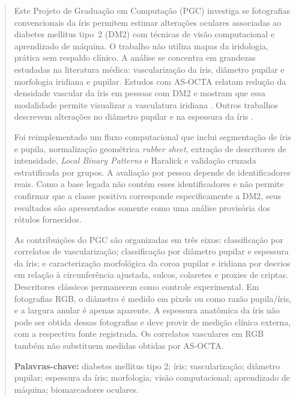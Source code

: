 \documentclass[12pt,a4paper]{article}
\begin{document}
\begin{abstract}
\noindent
Este Projeto de Graduação em Computação (PGC) investiga se fotografias convencionais da íris permitem
estimar alterações oculares associadas ao diabetes mellitus tipo~2 (DM2) com técnicas de visão
computacional e aprendizado de máquina. O trabalho não utiliza mapas da iridologia, prática sem
respaldo clínico. A análise se concentra em grandezas estudadas na literatura médica: vascularização
da íris, diâmetro pupilar e morfologia iridiana e pupilar. Estudos com AS-OCTA relatam redução da
densidade vascular da íris em pessoas com DM2 \citep{Zhou2025SciRep} e mostram que essa modalidade
permite visualizar a vasculatura iridiana \citep{Roberts2017CER,Zett2018Graefes}. Outros trabalhos
descrevem alterações no diâmetro pupilar e na espessura da íris
\citep{Cui2024BMC,Thakar2025Eye}.

Foi reimplementado um fluxo computacional que inclui segmentação de íris e pupila, normalização
geométrica \emph{rubber sheet}, extração de descritores de intensidade, \textit{Local Binary
Patterns} e Haralick e validação cruzada estratificada por grupos. A avaliação por pessoa depende de
identificadores reais. Como a base legada não contém esses identificadores e não permite confirmar
que a classe positiva corresponde especificamente a DM2, seus resultados são apresentados somente
como uma análise provisória dos rótulos fornecidos.

As contribuições do PGC são organizadas em três eixos: classificação por correlatos de
vascularização; classificação por diâmetro pupilar e espessura da íris; e caracterização morfológica
da coroa pupilar e iridiana por desvios em relação à circunferência ajustada, sulcos, colaretes e
proxies de criptas. Descritores clássicos permanecem como controle experimental. Em fotografias RGB,
o diâmetro é medido em pixels ou como razão pupila/íris, e a largura anular é apenas aparente. A
espessura anatômica da íris não pode ser obtida dessas fotografias e deve provir de medição clínica
externa, com a respectiva fonte registrada. Os correlatos vasculares em RGB também não substituem
medidas obtidas por AS-OCTA.

\vspace{0.3cm}
\noindent\textbf{Palavras-chave:} diabetes mellitus tipo 2; íris; vascularização; diâmetro pupilar;
espessura da íris; morfologia; visão computacional; aprendizado de máquina; biomarcadores oculares.
\end{abstract}
\end{document}
